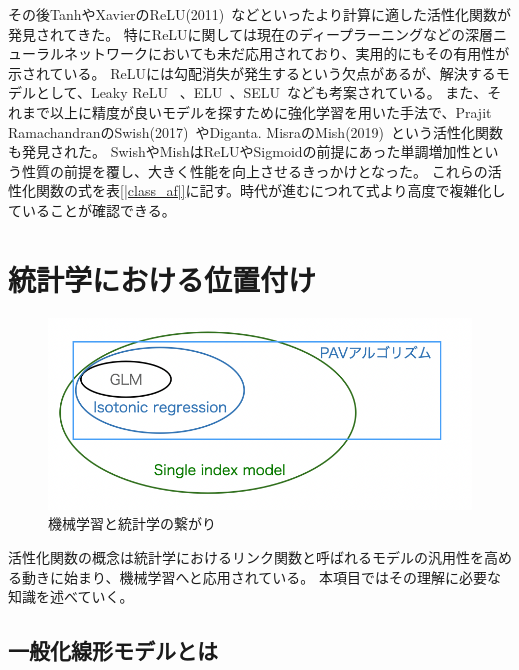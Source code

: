 その後TanhやXavierのReLU(2011)~\cite{ReLU}などといったより計算に適した活性化関数が発見されてきた。
特にReLUに関しては現在のディープラーニングなどの深層ニューラルネットワークにおいても未だ応用されており、実用的にもその有用性が示されている。
ReLUには勾配消失が発生するという欠点があるが、解決するモデルとして、Leaky ReLU ~\cite{leaky_relu}、ELU~\cite{elu}、SELU~\cite{selu}なども考案されている。
また、それまで以上に精度が良いモデルを探すために強化学習を用いた手法で、Prajit RamachandranのSwish(2017)~\cite{swish}やDiganta. MisraのMish(2019)~\cite{Mish}という活性化関数も発見された。
SwishやMishはReLUやSigmoidの前提にあった単調増加性という性質の前提を覆し、大きく性能を向上させるきっかけとなった。
これらの活性化関数の式を表\ref{|class_af|}に記す。時代が進むにつれて式より高度で複雑化していることが確認できる。

\section{統計学における位置付け}

\begin{figure}[hbtp]
        \includegraphics[width=15cm]{asset/machine_statistics.png}
            \caption{機械学習と統計学の繋がり}
            \label{glm}
\end{figure}

活性化関数の概念は統計学におけるリンク関数と呼ばれるモデルの汎用性を高める動きに始まり、機械学習へと応用されている。
本項目ではその理解に必要な知識を述べていく。



\subsection{一般化線形モデルとは}


